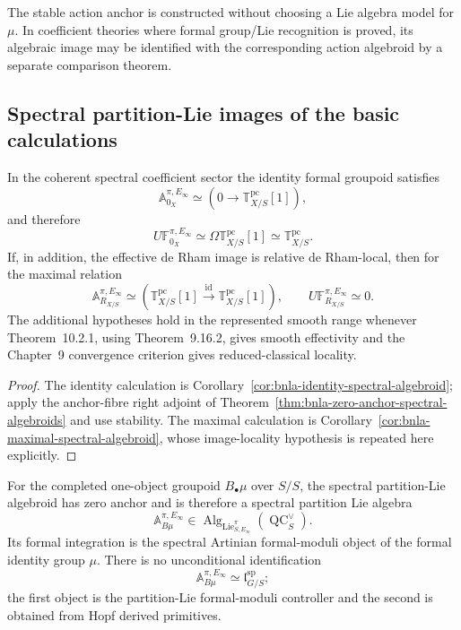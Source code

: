 \begin{remark}
The stable action anchor is constructed without choosing a Lie algebra model
for $\mu$.  In coefficient theories where formal group/Lie recognition is
proved, its algebraic image may be identified with the corresponding action
algebroid by a separate comparison theorem.
\end{remark}

\subsection{Spectral partition-Lie images of the basic calculations}

\begin{proposition}
\label{prop:bnla-extremal-spectral-algebroids}
In the coherent spectral coefficient sector the identity formal groupoid
satisfies
\[
    \mathbb A^{\pi,E_\infty}_{0_X}
    \simeq
    \left(
        0\longrightarrow
        \mathbb T^{\mathrm{pc}}_{X/S}[1]
    \right),
\]
and therefore
\[
    U\mathbb F^{\pi,E_\infty}_{0_X}
    \simeq
    \Omega\mathbb T^{\mathrm{pc}}_{X/S}[1]
    \simeq
    \mathbb T^{\mathrm{pc}}_{X/S}.
\]
If, in addition, the effective de Rham image is relative de Rham-local, then
for the maximal relation
\[
    \mathbb A^{\pi,E_\infty}_{R_{X/S}}
    \simeq
    \left(
        \mathbb T^{\mathrm{pc}}_{X/S}[1]
        \xrightarrow{\operatorname{id}}
        \mathbb T^{\mathrm{pc}}_{X/S}[1]
    \right),
    \qquad
    U\mathbb F^{\pi,E_\infty}_{R_{X/S}}
    \simeq0.
\]
The additional hypotheses hold in the represented smooth range whenever
Theorem~10.2.1, using Theorem~9.16.2, gives smooth effectivity and the
Chapter~9 convergence criterion gives reduced-classical locality.
\end{proposition}

\begin{proof}
The identity calculation is
Corollary~\ref{cor:bnla-identity-spectral-algebroid}; apply the anchor-fibre
right adjoint of Theorem~\ref{thm:bnla-zero-anchor-spectral-algebroids} and
use stability.  The maximal calculation is
Corollary~\ref{cor:bnla-maximal-spectral-algebroid}, whose image-locality
hypothesis is repeated here explicitly.
\end{proof}

\begin{proposition}
\label{prop:bnla-one-object-spectral-partition}
For the completed one-object groupoid $B_\bullet\mu$ over $S/S$, the spectral
partition-Lie algebroid has zero anchor and is therefore a spectral partition
Lie algebra
\[
\boxed{
    \mathbb A^{\pi,E_\infty}_{B\mu}
    \in
    \operatorname{Alg}_{\operatorname{Lie}^{\pi}_{S,E_\infty}}
    (\operatorname{QC}^{\vee}_S).}
\]
Its formal integration is the spectral Artinian formal-moduli object of the
formal identity group $\mu$.  There is no unconditional identification
\[
    \mathbb A^{\pi,E_\infty}_{B\mu}
    \simeq
    \mathfrak l^{\mathrm{sp}}_{G/S};
\]
the first object is the partition-Lie formal-moduli controller and the second
is obtained from Hopf derived primitives.
\end{proposition}

